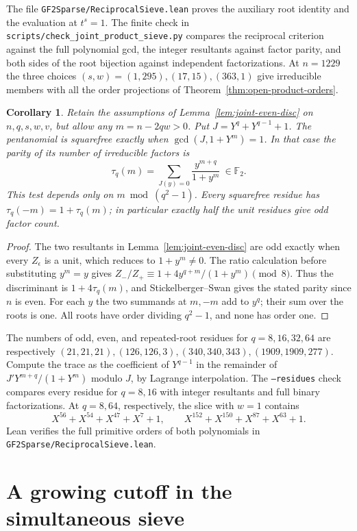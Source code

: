 \documentclass[11pt]{article}
\newtheorem{corollary}[theorem]{Corollary}
\begin{document}
The file \nolinkurl{GF2Sparse/ReciprocalSieve.lean} proves the auxiliary
root identity and the evaluation at \(t^s=1\).
The finite check in \nolinkurl{scripts/check_joint_product_sieve.py}
compares the reciprocal criterion against the full polynomial gcd,
the integer resultants against factor parity, and both sides of the
root bijection against independent factorizations. At \(n=1229\)
the three choices \((s,w)=(1,295),(17,15),(363,1)\) give irreducible
members with all the order projections of Theorem~\ref{thm:open-product-orders}.

\begin{corollary}\label{cor:joint-trace}
Retain the assumptions of Lemma~\ref{lem:joint-even-disc} on
\(n,q,s,w,v\), but allow any \(m=n-2qw>0\). Put \(J=Y^q+Y^{q-1}+1\).
The pentanomial is squarefree exactly when \(\gcd(J,1+Y^m)=1\).
In that case the parity of its number of irreducible factors is
\[
 \tau_q(m)=\sum_{J(y)=0}\frac{y^{m+q}}{1+y^m}\ \in\mathbb F_2 .
\]
This test depends only on \(m\bmod(q^2-1)\). Every squarefree
residue has \(\tau_q(-m)=1+\tau_q(m)\); in particular exactly half
the unit residues give odd factor count.
\end{corollary}
\begin{proof}
The two resultants in Lemma~\ref{lem:joint-even-disc} are odd exactly
when every \(Z_\epsilon\) is a unit, which reduces to \(1+y^m\ne0\).
The ratio calculation before substituting \(y^m=y\) gives
\(Z_-/Z_+\equiv1+4y^{q+m}/(1+y^m)\pmod8\). Thus the discriminant
is \(1+4\tau_q(m)\), and Stickelberger--Swan gives the stated parity
since \(n\) is even. For each \(y\) the two summands at \(m,-m\)
add to \(y^q\); their sum over the roots is one. All roots have
order dividing \(q^2-1\), and none has order one.
\end{proof}

The numbers of odd, even, and repeated-root residues for
\(q=8,16,32,64\) are respectively
\((21,21,21),(126,126,3),(340,340,343),(1909,1909,277)\).
Compute the trace as the coefficient of \(Y^{q-1}\) in the remainder
of \(J'Y^{m+q}/(1+Y^m)\) modulo \(J\), by Lagrange interpolation.
The \texttt{--residues} check compares every residue for \(q=8,16\)
with integer resultants and full binary factorizations.
At \(q=8,64\), respectively, the slice with \(w=1\) contains
\[
 X^{56}+X^{54}+X^{47}+X^7+1,\qquad
 X^{152}+X^{150}+X^{87}+X^{63}+1 .
\]
Lean verifies the full primitive orders of both polynomials in
\nolinkurl{GF2Sparse/ReciprocalSieve.lean}.

\section{A growing cutoff in the simultaneous sieve}\label{sec:growing-joint}
\end{document}
